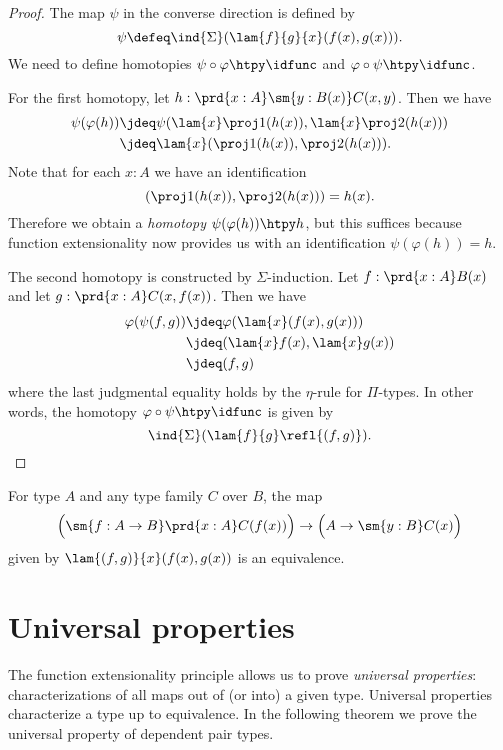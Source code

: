 \begin{proof}
The map $\psi$ in the converse direction is defined by
\begin{equation*}
\psi\defeq \ind{\Sigma}(\lam{f}{g}{x}(f(x),g(x))).
\end{equation*}
We need to define homotopies $\psi\circ\varphi\htpy \idfunc$ and $\varphi\circ\psi\htpy \idfunc$. 

For the first homotopy, let $h:\prd{x:A}\sm{y:B(x)}C(x,y)$. Then we have
\begin{align*}
\psi(\varphi(h)) & \jdeq \psi(\lam{x}\proj 1(h(x)),\lam{x}\proj 2(h(x))) \\
& \jdeq \lam{x}(\proj 1(h(x)),\proj 2(h(x))).
\end{align*}
Note that for each $x:A$ we have an identification
\begin{equation*}
(\proj 1(h(x)),\proj 2(h(x)))=h(x).
\end{equation*}
Therefore we obtain a \emph{homotopy} $\psi(\varphi(h))\htpy h$, but this suffices because function extensionality now provides us with an identification $\psi(\varphi(h))=h$.

The second homotopy is constructed by $\Sigma$-induction. Let $f:\prd{x:A}B(x)$ and let $g:\prd{x:A}C(x,f(x))$. 
Then we have
\begin{align*}
\varphi(\psi(f,g)) & \jdeq \varphi(\lam{x}(f(x),g(x))) \\
& \jdeq (\lam{x}f(x),\lam{x}g(x)) \\
& \jdeq (f,g)
\end{align*}
where the last judgmental equality holds by the $\eta$-rule for $\Pi$-types. In other words, the homotopy $\varphi\circ\psi\htpy \idfunc$ is given by
\begin{equation*}
\ind{\Sigma}(\lam{f}{g}\refl{(f,g)}).\qedhere
\end{equation*}
\end{proof}

\begin{cor}
For type $A$ and any type family $C$ over $B$, the map
\begin{equation*}
\Big(\sm{f:A\to B} \prd{x:A}C(f(x))\Big)\to\Big(A\to\sm{y:B}C(x)\Big)
\end{equation*}
given by $\lam{(f,g)}{x}(f(x),g(x))$ is an equivalence.
\end{cor}

\section{Universal properties}
The function extensionality principle allows us to prove \emph{universal properties}: characterizations of all maps out of (or into) a given type. Universal properties characterize a type up to equivalence. In the following theorem we prove the universal property of dependent pair types.

